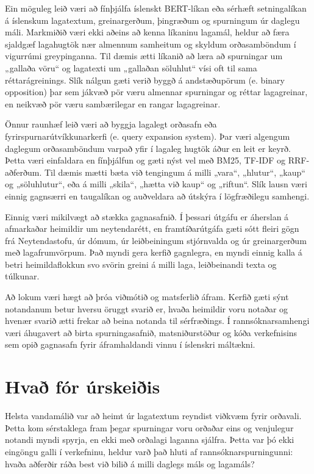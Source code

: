 \documentclass[fleqn]{report}
\begin{document}
Ein möguleg leið væri að fínþjálfa íslenskt BERT-líkan eða sérhæft setningalíkan á íslenskum lagatextum, greinargerðum, þingræðum og spurningum úr daglegu máli. Markmiðið væri ekki aðeins að kenna líkaninu lagamál, heldur að færa sjaldgæf lagahugtök nær almennum samheitum og skyldum orðasamböndum í vigurrúmi greypinganna. Til dæmis ætti líkanið að læra að spurningar um „gallaða vöru“ og lagatexti um „gallaðan söluhlut“ vísi oft til sama réttarágreinings. Slík nálgun gæti verið byggð á andstæðupörum (e. binary opposition)  þar sem jákvæð pör væru almennar spurningar og réttar lagagreinar, en neikvæð pör væru sambærilegar en rangar lagagreinar.

Önnur raunhæf leið væri að byggja lagalegt orðasafn eða fyrirspurnarútvíkkunarkerfi (e. query expansion system). Þar væri algengum daglegum orðasamböndum varpað yfir í lagaleg hugtök áður en leit er keyrð. Þetta væri einfaldara en fínþjálfun og gæti nýst vel með BM25, TF-IDF og RRF-aðferðum. Til dæmis mætti bæta við tengingum á milli „vara“, „hlutur“, „kaup“ og „söluhlutur“, eða á milli „skila“, „hætta við kaup“ og „riftun“. Slík lausn væri einnig gagnsærri en taugalíkan og auðveldara að útskýra í lögfræðilegu samhengi.

Einnig væri mikilvægt að stækka gagnasafnið. Í þessari útgáfu er áherslan á afmarkaðar heimildir um neytendarétt, en framtíðarútgáfa gæti sótt fleiri gögn frá Neytendastofu, úr dómum, úr leiðbeiningum stjórnvalda og úr greinargerðum með lagafrumvörpum. Það myndi gera kerfið gagnlegra, en myndi einnig kalla á betri heimildaflokkun svo svörin greini á milli laga, leiðbeinandi texta og túlkunar.

Að lokum væri hægt að þróa viðmótið og matsferlið áfram. Kerfið gæti sýnt notandanum betur hversu öruggt svarið er, hvaða heimildir voru notaðar og hvenær svarið ætti frekar að beina notanda til sérfræðings. Í rannsóknarsamhengi væri áhugavert að birta spurningasafnið, matsniðurstöður og kóða verkefnisins sem opið gagnasafn fyrir áframhaldandi vinnu í íslenskri máltækni.


\section{Hvað fór úrskeiðis}

Helsta vandamálið var að heimt úr lagatextum reyndist viðkvæm fyrir orðavali. Þetta kom sérstaklega fram þegar spurningar voru orðaðar eins og venjulegur notandi myndi spyrja, en ekki með orðalagi laganna sjálfra. Þetta var þó ekki eingöngu galli í verkefninu, heldur varð það hluti af rannsóknarspurningunni: hvaða aðferðir ráða best við bilið á milli daglegs máls og lagamáls?
\end{document}
